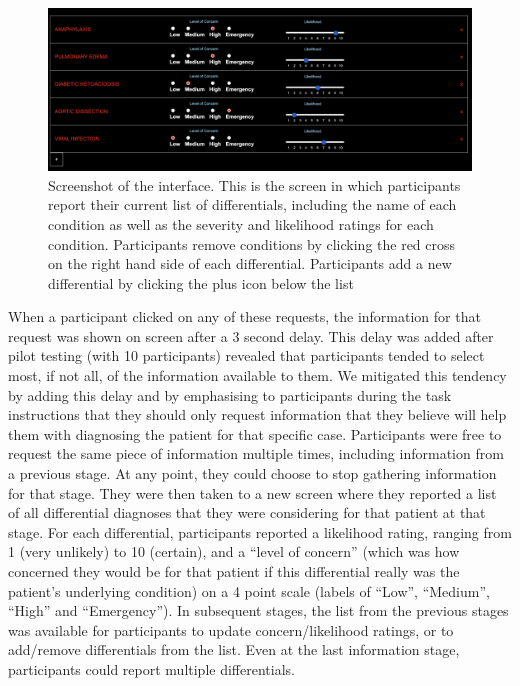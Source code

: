 \documentclass[a4paper, nobind]{templates/ociamthesis}
\begin{document}
\begin{figure}[H]

{\centering \includegraphics[width=1\linewidth]{./assets/Screenshot2} 

}

\caption{Screenshot of the interface. This is the screen in which participants report their current list of differentials, including the name of each condition as well as the severity and likelihood ratings for each condition. Participants remove conditions by clicking the red cross on the right hand side of each differential. Participants add a new differential by clicking the plus icon below the list}\label{fig:screenshot2}
\end{figure}

When a participant clicked on any of these requests, the information for that request was shown on screen after a 3 second delay. This delay was added after pilot testing (with 10 participants) revealed that participants tended to select most, if not all, of the information available to them. We mitigated this tendency by adding this delay and by emphasising to participants during the task instructions that they should only request information that they believe will help them with diagnosing the patient for that specific case. Participants were free to request the same piece of information multiple times, including information from a previous stage. At any point, they could choose to stop gathering information for that stage. They were then taken to a new screen where they reported a list of all differential diagnoses that they were considering for that patient at that stage. For each differential, participants reported a likelihood rating, ranging from 1 (very unlikely) to 10 (certain), and a ``level of concern'' (which was how concerned they would be for that patient if this differential really was the patient's underlying condition) on a 4 point scale (labels of ``Low'', ``Medium'', ``High'' and ``Emergency''). In subsequent stages, the list from the previous stages was available for participants to update concern/likelihood ratings, or to add/remove differentials from the list. Even at the last information stage, participants could report multiple differentials.\\
\end{document}
